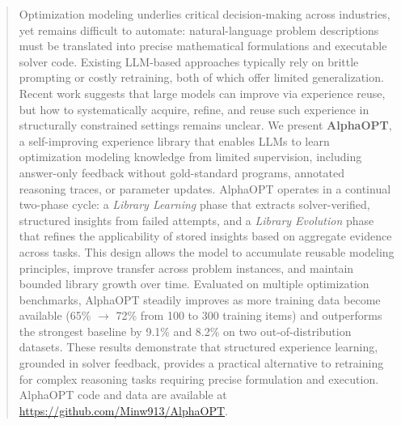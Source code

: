 \documentclass[sigconf, nonacm]{acmart}
\begin{document}


\begin{abstract}
Optimization modeling underlies critical decision-making across industries, yet remains difficult to automate: natural-language problem descriptions must be translated into precise mathematical formulations and executable solver code. Existing LLM-based approaches typically rely on brittle prompting or costly retraining, both of which offer limited generalization. Recent work suggests that large models can improve via experience reuse, but how to systematically acquire, refine, and reuse such experience in structurally constrained settings remains unclear. We present \textbf{AlphaOPT}, a self-improving experience library that enables LLMs to learn optimization modeling knowledge from limited supervision, including answer-only feedback without gold-standard programs, annotated reasoning traces, or parameter updates. AlphaOPT operates in a continual two-phase cycle: a \emph{Library Learning} phase that extracts solver-verified, structured insights from failed attempts, and a \emph{Library Evolution} phase that refines the applicability of stored insights based on aggregate evidence across tasks. This design allows the model to accumulate reusable modeling principles, improve transfer across problem instances, and maintain bounded library growth over time. Evaluated on multiple optimization benchmarks, AlphaOPT steadily improves as more training data become available (65\% $\rightarrow$ 72\% from 100 to 300 training items) and outperforms the strongest baseline by 9.1\% and 8.2\% on two out-of-distribution datasets. These results demonstrate that structured experience learning, grounded in solver feedback, provides a practical alternative to retraining for complex reasoning tasks requiring precise formulation and execution. 
AlphaOPT code and data are available at \href{https://github.com/Minw913/AlphaOPT}{https://github.com/Minw913/AlphaOPT}.
\end{abstract}
\end{document}
